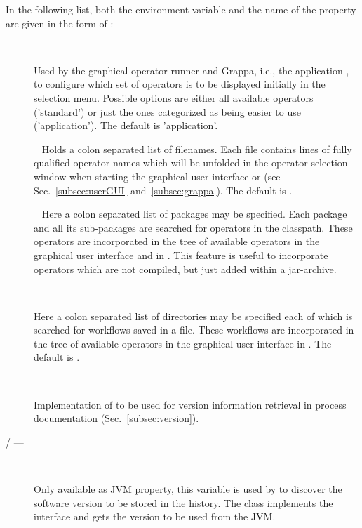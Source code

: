 In the following list, both the environment variable and the name of the
property are given in the form of :
\begin{description}
 \item[] ~

	Used by the graphical operator runner  and Grappa,
	i.e., the application , to configure which set of
	operators is to be displayed initially in the selection menu.
	Possible options are either all available operators ('standard')             
	or just the ones categorized as being easier to use ('application').
	The default is 'application'.

 \item[] ~
	Holds a colon separated list of filenames. Each file
	contains lines of fully qualified operator names which will be unfolded
	in the operator selection window when starting the graphical user interface
	or \grappa (see Sec.~\ref{subsec:userGUI} and~\ref{subsec:grappa}).
	The default is .

 \item[] ~
	Here a colon separated list of packages may be specified.
	Each package and all its sub-packages 
	are searched for operators in the classpath.
	These operators are incorporated in the tree of available operators
	in the graphical user interface
    and in \grappa.
	This feature is useful to incorporate operators which are not compiled,
	but just added within a jar-archive.
	
 \item[] ~

	Here a colon separated list of directories may be specified each of which
	is searched for workflows saved in a file.
	These workflows are incorporated in the tree of available operators
	in the graphical user interface
        in \grappa.
	The default is .
	

	
 \item[] ~

 Implementation of  to be used
 for version information retrieval in process documentation
 (Sec.~\ref{subsec:version}).
 
 \item[ / --- ] ~
 
 Only available as JVM property, this variable is used by
  to discover the software version to be stored
 in the history. The class  implements the
  interface and gets the version to be used from the
 JVM.
\end{description}

